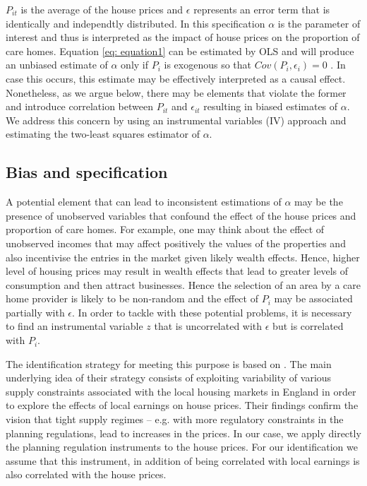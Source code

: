\documentclass[12pt,letterpaper]{article}
\begin{document}
       $P_{it}$ is the average of the house prices and $\epsilon$
       represents an error term that is identically and independtly distributed. In this specification $\alpha$ is the 
       parameter of interest and thus is interpreted as the impact of house prices on the proportion 
       of care homes. Equation \ref{eq: equation1} can be estimated by OLS and will produce an unbiased estimate of $\alpha$ only if
         $P_i$ is exogenous so that $Cov(P_{i}, \epsilon_{i}) = 0 $ . In case this occurs, this estimate may be effectively interpreted as
          a causal effect. Nonetheless, as we argue below, there may be elements that violate the former and introduce correlation between $P_{it}$ and
 $\epsilon_{it}$ resulting in biased estimates of $\alpha$. We address this concern by using an instrumental
  variables (IV) approach and estimating the two-least squares estimator of $\alpha$. 
  
    \subsection*{Bias and specification}
   
A potential element that can lead to inconsistent estimations of $\alpha$ may be the presence of unobserved
 variables that confound the effect of the house prices and proportion of care homes. For example, one may think about
  the effect of unobserved incomes that may affect positively the values of the properties and also incentivise
   the entries in the market given likely wealth effects. Hence, higher level of housing prices may result in
    wealth effects that lead to greater levels of consumption and then attract businesses. Hence the selection
     of an area by a care home provider is likely to be non-random and the effect of $P_{i}$ may be associated partially 
     with $\epsilon$. In order to tackle with these potential
      problems, it is necessary to find an instrumental variable $z$  that is uncorrelated with $\epsilon$ but is correlated
       with $P_{i}$.
       
  The identification strategy for meeting this purpose is based on
  \citet{hilber2016supply}.
The main underlying idea of their strategy consists of exploiting variability of various supply
constraints associated with the local housing markets in England in order to explore the effects of local earnings
 on house prices. Their findings confirm the vision that tight supply regimes – e.g. with more regulatory 
 constraints in the planning regulations, lead to increases in the prices. In our case, we apply directly 
 the planning regulation instruments to the house prices. For our identification we assume that this instrument,
  in addition of being correlated with local earnings is also correlated with the house prices. 
  
\end{document}
